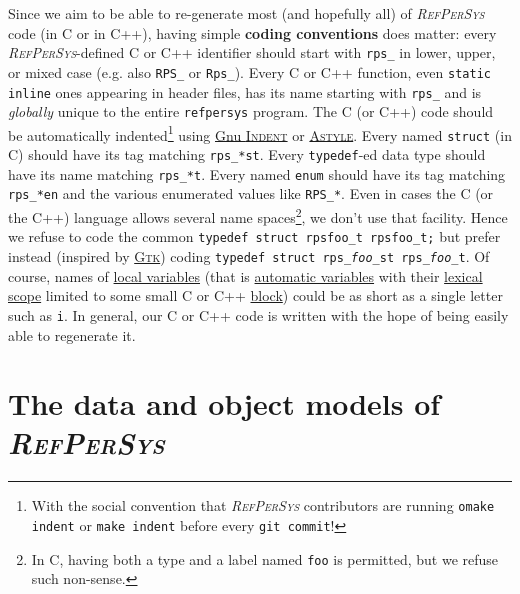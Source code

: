 \documentclass[11pt,a4paper,svgnames]{article}
\newcommand{\RefPerSys}{{\textit{\textsc{RefPerSys}}}}
\begin{document}
 \smallskip

 Since we aim to be able to re-generate most (and hopefully all) of
 {\RefPerSys} code (in C or in C++), having simple \textbf{coding
   conventions} does matter: every \RefPerSys-defined C or C++
 identifier should start with \texttt{rps\_} in lower, upper, or mixed
 case (e.g. also \texttt{RPS\_} or \texttt{Rps\_}). Every C or C++
 function, even \texttt{static inline} ones appearing in header files,
 has its name starting with \texttt{rps\_} and is \emph{globally}
 unique to the entire \texttt{refpersys} program. The C (or C++) code
 should be automatically indented\footnote{With the social convention
 that {\RefPerSys} contributors are running \texttt{omake indent} or
 \texttt{make indent} before every \texttt{git commit}!} using
 \href{https://www.gnu.org/software/indent/}{Gnu \textsc{Indent}} or
 \href{http://astyle.sourceforge.net/}{\textsc{Astyle}}. Every named
 \texttt{struct} (in C) should have its tag matching
 \texttt{rps\_*st}. Every \texttt{typedef}-ed data type should have
 its name matching \texttt{rps\_*t}. Every named \texttt{enum} should
 have its tag matching \texttt{rps\_*en} and the various enumerated
 values like \texttt{RPS\_*}. Even in cases the C (or the C++)
 language allows several name spaces\footnote{In C, having both a type
 and a label named \texttt{foo} is permitted, but we refuse such
 non-sense.}, we don't use that facility. Hence we refuse to code the
 common \texttt{typedef struct rpsfoo\_t rpsfoo\_t;} but prefer
 instead (inspired by \href{http://gtk.org}{\textsc{Gtk}}) coding
 \texttt{typedef struct rps\_\textit{foo}\_st
   rps\_\textit{foo}\_t}. Of course, names of
 \href{https://en.wikipedia.org/wiki/Local\_variable}{local variables}
 (that is
 \href{https://en.wikipedia.org/wiki/Automatic_variable}{automatic
   variables} with their
 \href{https://en.wikipedia.org/wiki/Scope\_(computer\_science)\#Lexical\_scoping}{lexical
   scope} limited to some small C or C++
 \href{https://en.wikipedia.org/wiki/Block\_(programming)}{block})
 could be as short as a single letter such as \texttt{i}. In general,
 our C or C++ code is written with the hope of being easily able to
 regenerate it.
 
\bigskip


\section{The data and object models of \RefPerSys}
\label{sec:dataobjmodel}
\end{document}
